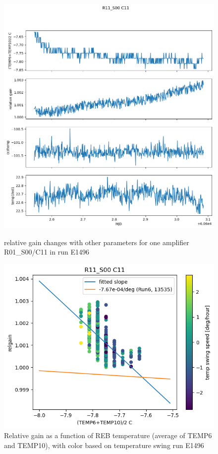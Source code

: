 \begin{figure}[htbp]
\centering
\begin{minipage}{0.45\textwidth}
    \centering
    \includegraphics[width=\textwidth]{figures/gaintemp/E1496RelgainParametersTrending.png}
    \caption{relative gain changes with other parameters for one amplifier R01\_S00/C11 in run E1496}
    \label{fig:relgainparamE1496}
\end{minipage}
\hfill
\begin{minipage}{0.45\textwidth}
    \centering
    \includegraphics[width=\textwidth]{figures/gaintemp/E1496RelgainDetail.png}
    \caption{Relative gain as a function of REB temperature (average of TEMP6 and TEMP10), with color based on temperature swing run E1496}
    \label{fig:gaintempE1496}
\end{minipage}
\end{figure}
